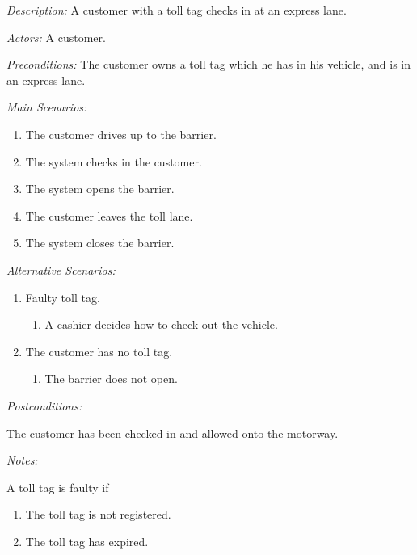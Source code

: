\textit{Description: } A customer with a toll tag checks in at an express lane.

\textit{Actors:} A customer.

\textit{Preconditions:} The customer owns a toll tag which he has in his vehicle, and is in
an express lane.

\textit{Main Scenarios:}
\begin{enumerate}
\item The customer drives up to the barrier.
\item The system checks in the customer.
\item The system opens the barrier.
\item The customer leaves the toll lane.
\item The system closes the barrier.
\end{enumerate}

\textit{Alternative Scenarios:}
\begin{enumerate}
\item Faulty toll tag.

\begin{enumerate}
\item A cashier decides how to check out the vehicle.
\end{enumerate}
\item The customer has no toll tag.

\begin{enumerate}
\item The barrier does not open.
\end{enumerate}
\end{enumerate}

\textit{Postconditions:}

The customer has been checked in and allowed onto the motorway.

\textit{Notes:}

A toll tag is faulty if
\begin{enumerate}
\item The toll tag is not registered.
\item The toll tag has expired.\end{enumerate}

